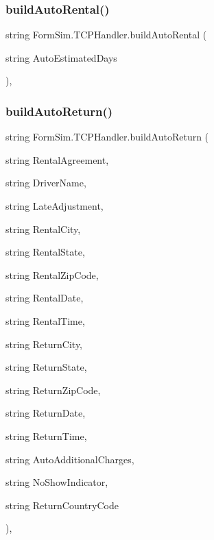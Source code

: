 \subsubsection{\texorpdfstring{build\+Auto\+Rental()}{buildAutoRental()}}
{\footnotesize\ttfamily string Form\+Sim.\+T\+C\+P\+Handler.\+build\+Auto\+Rental (\begin{DoxyParamCaption}\item[{string}]{Auto\+Estimated\+Days }\end{DoxyParamCaption})\hspace{0.3cm}{\ttfamily [inline]}, {\ttfamily [private]}}

\mbox{\label{class_form_sim_1_1_t_c_p_handler_a9f96d9f729c2dd000b31f7cafb5d19f8}} 
\subsubsection{\texorpdfstring{build\+Auto\+Return()}{buildAutoReturn()}}
{\footnotesize\ttfamily string Form\+Sim.\+T\+C\+P\+Handler.\+build\+Auto\+Return (\begin{DoxyParamCaption}\item[{string}]{Rental\+Agreement,  }\item[{string}]{Driver\+Name,  }\item[{string}]{Late\+Adjustment,  }\item[{string}]{Rental\+City,  }\item[{string}]{Rental\+State,  }\item[{string}]{Rental\+Zip\+Code,  }\item[{string}]{Rental\+Date,  }\item[{string}]{Rental\+Time,  }\item[{string}]{Return\+City,  }\item[{string}]{Return\+State,  }\item[{string}]{Return\+Zip\+Code,  }\item[{string}]{Return\+Date,  }\item[{string}]{Return\+Time,  }\item[{string}]{Auto\+Additional\+Charges,  }\item[{string}]{No\+Show\+Indicator,  }\item[{string}]{Return\+Country\+Code }\end{DoxyParamCaption})\hspace{0.3cm}{\ttfamily [inline]}, {\ttfamily [private]}}

